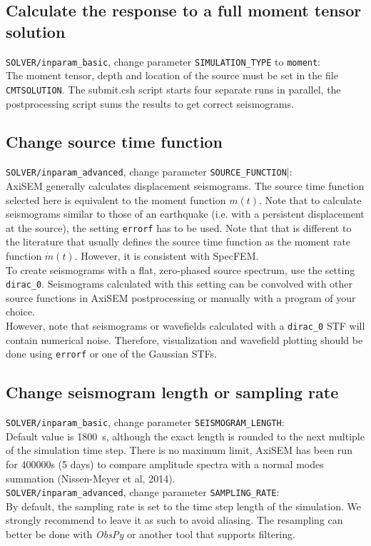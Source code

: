 \documentclass{article}
\begin{document}
\subsection{Calculate the response to a full moment tensor solution}
\verb|SOLVER/inparam_basic|, change parameter \verb|SIMULATION_TYPE| to \verb|moment|:\\
The moment tensor, depth and location of the source must be set in the file
\verb|CMTSOLUTION|. The submit.csh script starts four separate runs in parallel, the
postprocessing script sums the results to get correct seismograms.


\subsection{Change source time function}
\verb|SOLVER/inparam_advanced|, change parameter \verb|SOURCE_FUNCTION||:\\
AxiSEM generally calculates displacement seismograms. The source time function selected
here is equivalent to the moment function $m(t)$. Note that to calculate seismograms
similar to those of an earthquake (i.e. with a persistent displacement at the source), the
setting \verb|errorf| has to be used. Note that that is different to the literature that
usually defines the source time function as the moment rate function $\dot{m}(t)$.
However, it is consistent with SpecFEM.\\
To create seismograms with a flat, zero-phased source spectrum, use the setting
\verb|dirac_0|. Seismograms calculated with this setting can be convolved with other
source functions in AxiSEM postprocessing or manually with a program of your choice.\\
However, note that seismograms or wavefields calculated with a \verb|dirac_0| STF will
contain numerical noise. Therefore, visualization and wavefield plotting should be done
using \verb|errorf| or one of the Gaussian STFs.


\subsection{Change seismogram length or sampling rate}
\verb|SOLVER/inparam_basic|, change parameter \verb|SEISMOGRAM_LENGTH|:\\
Default value is 1800~s, although the exact length is rounded to the next multiple of the
simulation time step. There is no maximum limit, AxiSEM has been run for 400000s (5 days)
to compare amplitude spectra with a normal modes summation (Nissen-Meyer et al, 2014).\\
\verb|SOLVER/inparam_advanced|, change parameter \verb|SAMPLING_RATE|:\\
By default, the sampling rate is set to the time step length of the simulation. We
strongly recommend to leave it as such to avoid aliasing. The resampling can better be
done with \textit{ObsPy} or another tool that supports filtering.
\end{document}
